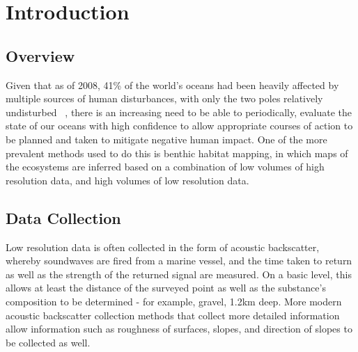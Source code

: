 \documentclass[journal]{IEEEtran}
\begin{document}
\section{Introduction}
% 
% 
% 
% 
% 
%  

    \subsection{Overview}
    
    Given that as of 2008, 41\% of the world's oceans had been heavily affected by multiple sources of human disturbances, with only the two poles relatively undisturbed ~\citep{halpern08}, there is an increasing need to be able to periodically, evaluate the state of our oceans with high confidence to allow appropriate courses of action to be planned and taken to mitigate negative human impact. One of the more prevalent methods used to do this is benthic habitat mapping, in which maps of the ecosystems are inferred based on a combination of low volumes of high resolution data, and high volumes of low resolution data. 
    
    \subsection{Data Collection}
    Low resolution data is often collected in the form of acoustic backscatter, whereby soundwaves are fired from a marine vessel, and the time taken to return as well as the strength of the returned signal are measured. On a basic level, this allows at least the distance of the surveyed point as well as the substance's composition to be determined - for example, gravel, 1.2km deep. More modern acoustic backscatter collection methods that collect more detailed information allow information such as roughness of surfaces, slopes, and direction of slopes to be collected as well. 
    
\end{document}

